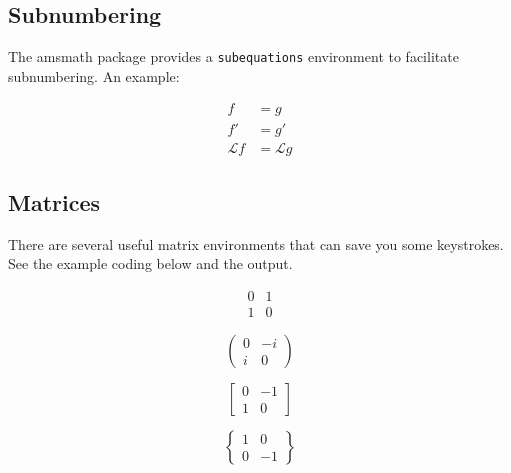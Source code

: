 \documentclass[journal,9pt]{IEEEtran}
\begin{document}
\subsection{Subnumbering}
The amsmath package provides a {\tt{subequations}} environment to facilitate subnumbering. An example:

\begin{subequations}\label{eq:2}
  \begin{align}
    f            & =g \label{eq:2A}             \\
    f'           & =g' \label{eq:2B}            \\
    \mathcal{L}f & = \mathcal{L}g \label{eq:2c}
  \end{align}
\end{subequations}


\subsection{Matrices}
There are several useful matrix environments that can save you some keystrokes. See the example coding below and the output.

\begin{equation}
  \begin{matrix}  0 & 1 \\
                1 & 0\end{matrix}
\end{equation}

\begin{equation}
  \begin{pmatrix} 0 & -i \\
                i & 0\end{pmatrix}
\end{equation}


\begin{equation}
  \begin{bmatrix} 0 & -1 \\
                1 & 0\end{bmatrix}
\end{equation}


\begin{equation}
  \begin{Bmatrix} 1 & 0  \\
                0 & -1\end{Bmatrix}
\end{equation}
\end{document}
